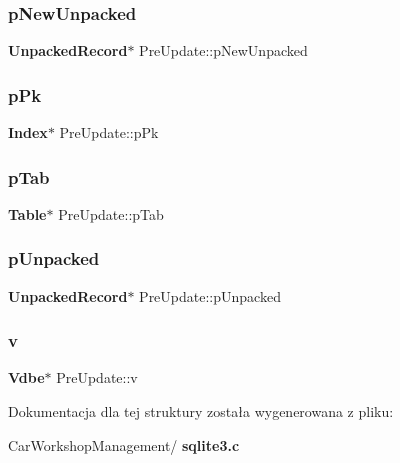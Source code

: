 \mbox{\label{struct_pre_update_a70c572bb14af1dfdff8a1d6619548de0}} 
\subsubsection{pNewUnpacked}
{\footnotesize\ttfamily \textbf{ Unpacked\+Record}$\ast$ Pre\+Update\+::p\+New\+Unpacked}

\mbox{\label{struct_pre_update_a7258663d158a1c21b62f30c9de685482}} 
\subsubsection{pPk}
{\footnotesize\ttfamily \textbf{ Index}$\ast$ Pre\+Update\+::p\+Pk}

\mbox{\label{struct_pre_update_a6e7848e9ef889f2dc47f68a5a2a0ed4a}} 
\subsubsection{pTab}
{\footnotesize\ttfamily \textbf{ Table}$\ast$ Pre\+Update\+::p\+Tab}

\mbox{\label{struct_pre_update_ab43a1f36e6ab8c9aa8b1e52f1d80d07f}} 
\subsubsection{pUnpacked}
{\footnotesize\ttfamily \textbf{ Unpacked\+Record}$\ast$ Pre\+Update\+::p\+Unpacked}

\mbox{\label{struct_pre_update_a6fccc7c418de1a789595f9814a4f5f81}} 
\subsubsection{v}
{\footnotesize\ttfamily \textbf{ Vdbe}$\ast$ Pre\+Update\+::v}



Dokumentacja dla tej struktury została wygenerowana z pliku\+:\begin{DoxyCompactItemize}
\item 
Car\+Workshop\+Management/\textbf{ sqlite3.\+c}\end{DoxyCompactItemize}
